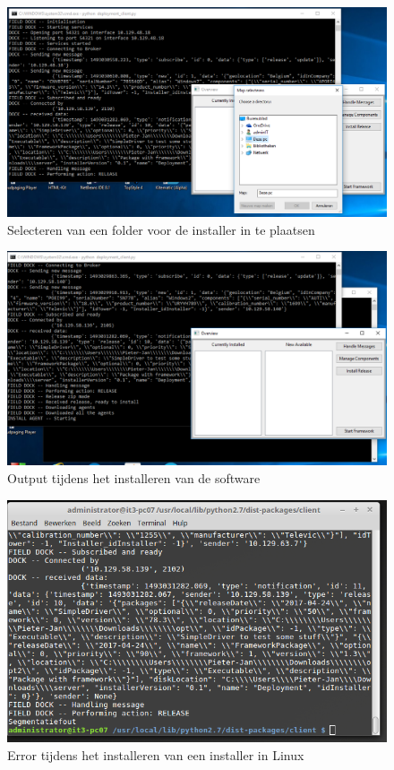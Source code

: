 \begin{figure}[!ht]
\centering
\includegraphics[width=\textwidth,keepaspectratio]{afbeelding/testMultiClient/MapSelection.png}
\caption{Selecteren van een folder voor de installer in te plaatsen}
\label{fig:testClient:mapSelection}
\end{figure}

\begin{figure}
\centering
\includegraphics[width=\textwidth,height=\textheight,keepaspectratio]{afbeelding/testMultiClient/TijdensInstallatie_cut.png}
\caption{Output tijdens het installeren van de software}
\label{fig:testClient:tijdensInstallatie}
\end{figure}

\begin{figure}[!ht]
\centering
\includegraphics[width=\textwidth,keepaspectratio]{afbeelding/testMultiClient/LinuxInstallatieError.png}
\caption{Error tijdens het installeren van een installer in Linux}
\label{fig:testClient:linuxError}
\end{figure}

